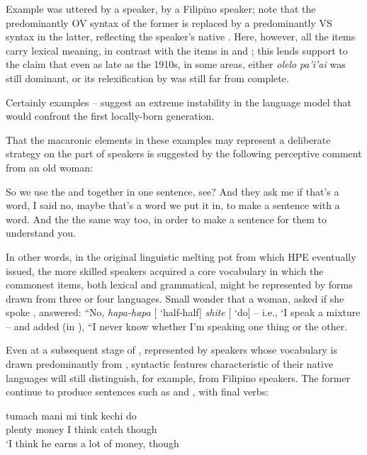 \noindent Example  was uttered by a  speaker,  by a Filipino speaker; note that the predominantly OV syntax of the former is replaced by a predominantly VS syntax in the latter, reflecting the speaker's native . Here, however, all the  items carry lexical meaning, in contrast with the  items in  and ; this lends support to the claim that even as late as the 1910s, in some areas, either \textit{olelo} \textit{pa'i'ai} was still dominant, or its relexification by  was still far from complete.

Certainly examples -- suggest an extreme instability in the language model that would confront the first locally-born generation.

That the macaronic elements in these examples may represent a deliber\-ate strategy on the part of speakers is suggested by the following perceptive comment from an old  woman:

\ea\label{ex:5}
 So we use the  and  together in one sentence, see? And they ask me if that's a  word, I said no, maybe that's a  word we put it in, to make a sentence with a  word. And the  the same way too, in order to make a sentence for them to understand you.
\z

\noindent In other words, in the original linguistic melting pot from which HPE eventually issued, the more skilled speakers acquired a core vocabulary in which the commonest items, both lexical and grammatical, might be represented by forms drawn from three or four languages. Small wonder that a  woman, asked if she spoke , answered: ``No, \textit{hapa-hapa} [ `half-half] \textit{shite} [ `do] -- i.e., `I speak a mixture -- and added (in ), ``I never know whether I'm speaking one thing or the other.

Even at a subsequent stage of , represented by speakers whose vocabulary is drawn predominantly from , syntactic features characteristic of their native languages will still distinguish, for example,  from Filipino speakers. The former continue to produce sentences such as  and , with final verbs:

\ea\label{ex:6}
\gll tumach mani mi tink kechi do\\
 plenty money I think catch though\\
\glt  `I think he earns a lot of money, though
\z

